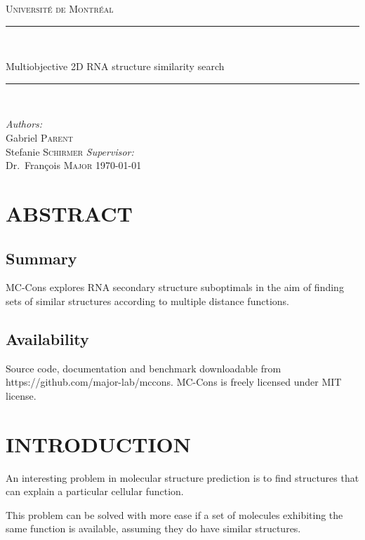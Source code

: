 \documentclass[a4paper, 12pt] {article}
\newcommand{\HRule}{\rule{\linewidth}{0.5mm}}
\begin{document}

\begin{titlepage}
\begin{center}
\textsc{\LARGE Université de Montréal}\\[1.5cm]

\HRule \\[0.4cm]

{\huge Multiobjective 2D RNA structure similarity search
\HRule \\[0.4cm]}
\vfill
\emph{Authors:}\\
Gabriel \textsc{Parent}\\
Stefanie \textsc {Schirmer}
\vfill
\emph{Supervisor:} \\
Dr.~François \textsc{Major}
\vfill
{\large \today}
\end{center}
\end{titlepage}


\section*{ABSTRACT}
\subsection*{Summary}
\noindent
MC-Cons explores RNA secondary structure suboptimals
in the aim of finding sets of similar structures
according to multiple distance functions.


\subsection*{Availability}
Source code, documentation and benchmark
downloadable from https://github.com/major-lab/mccons.
MC-Cons is freely licensed under MIT license.


\section*{INTRODUCTION}

An interesting problem in molecular structure prediction is to find structures
that can explain a particular cellular function.

This problem can be solved with more ease if a set of molecules exhibiting
the same function is available, assuming they do have similar structures.
\end{document}

